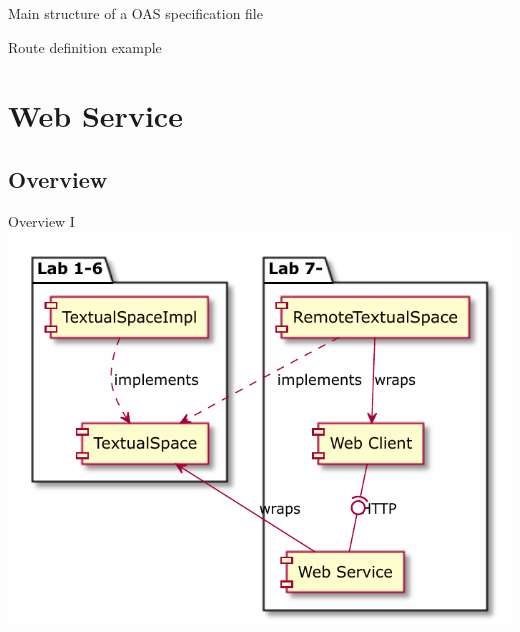\documentclass[presentation]{beamer}\mode<presentation>{\usetheme{AMSCesenaPurpleAndGold}}
\begin{document}
\begin{frame}[allowframebreaks]{Main structure of a OAS specification file}
    
\end{frame}

\begin{frame}[allowframebreaks]{Route definition example}
    
\end{frame}

\section{\linda{} Web Service}

\subsection{Overview}

\begin{frame}{Overview I}
    \centering
    \includegraphics[height=.8\textheight]{img/whole-picture.pdf}
\end{frame}
\end{document}
